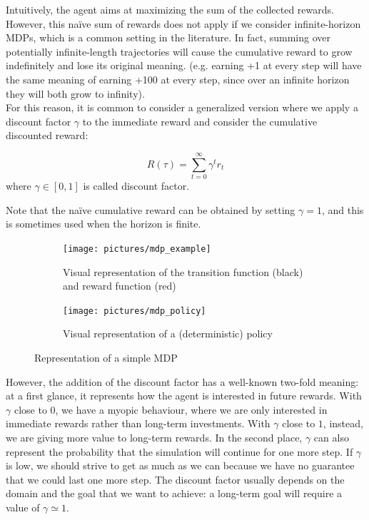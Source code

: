Intuitively, the agent aims at maximizing the sum of the collected rewards. However, this na\"ive sum of rewards does not apply if we consider infinite-horizon MDPs, which is a common setting in the literature. In fact, summing over potentially infinite-length trajectories will cause the cumulative reward to grow indefinitely and lose its original meaning. (e.g. earning +1 at every step will have the same meaning of earning +100 at every step, since over an infinite horizon they will both grow to infinity).\\
For this reason, it is common to consider a generalized version where we apply a discount factor $\gamma$ to the immediate reward and consider the cumulative discounted reward:
\begin{definition}
\begin{equation*}
R(\tau) = \sum_{t=0}^{\infty} \gamma^t r_t
\end{equation*}
where $\gamma \in [0,1]$ is called discount factor. 
\end{definition}
Note that the na\"ive cumulative reward can be obtained by setting $\gamma=1$, and this is sometimes used when the horizon is finite. 

\begin{figure}[t]
\centering
\begin{subfigure}[t]{0.495\textwidth}
\texttt{[image: pictures/mdp\_example]}
\caption{Visual representation of the transition function (black) and reward function (red)}
\end{subfigure}
\hfill
\begin{subfigure}[t]{0.495\textwidth}
\texttt{[image: pictures/mdp\_policy]}
\caption{Visual representation of a (deterministic) policy}
\end{subfigure}
\caption{Representation of a simple MDP} \label{fig:mdp-example}
\end{figure}

However, the addition of the discount factor has a well-known two-fold meaning: at a first glance, it represents how the agent is interested in future rewards. With $\gamma$ close to $0$, we have a myopic behaviour, where we are only interested in immediate rewards rather than long-term investments. With $\gamma$ close to $1$, instead, we are giving more value to long-term rewards. In the second place, $\gamma$ can also represent the probability that the simulation will continue for one more step. If $\gamma$ is low, we should strive to get as much as we can because we have no guarantee that we could last one more step.
The discount factor usually depends on the domain and the goal that we want to achieve: a long-term goal will require a value of $\gamma \simeq 1$.


